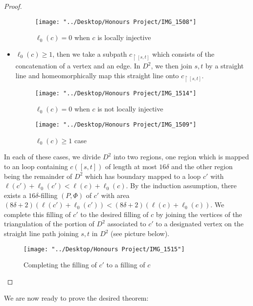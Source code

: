 \documentclass[12pt]{article}
\newcommand{\vs}{\vskip10pt}
\begin{document}
\begin{proof}
\begin{itemize}
\begin{figure} [H]
	\centering
	\texttt{[image: "../Desktop/Honours Project/IMG\_1508"]}
	\caption{$\ell_0(c) = 0$ when $c$ is locally injective}
	\label{fig:img1508}
\end{figure}
			\item $\ell_0(c) \geq 1$, then we take a subpath $c_{\restriction [s,t]}$ which consists of the concatenation of a vertex and an edge. In $D^2$, we then join $s,t$ by a straight line and homeomorphically map this straight line onto $c_{\restriction [s,t]}$. 
			
			\begin{figure} [H]
				\centering
				\texttt{[image: "../Desktop/Honours Project/IMG\_1514"]}
				\caption{$\ell_0(c) = 0$ when $c$ is not locally injective}
				\label{fig:img1514}
			\end{figure}
			
\begin{figure} [H]
	\centering
	\texttt{[image: "../Desktop/Honours Project/IMG\_1509"]}
	\caption{$\ell_0(c) \geq 1$ case}
	\label{fig:img1509}
\end{figure}
		\end{itemize}
	
		In each of these cases, we divide $D^2$ into two regions, one region which is mapped to an loop containing $c([s,t])$ of length at most $16 \delta$ and the other region being the remainder of $D^2$ which has boundary mapped to a loop $c'$ with $\ell(c') + \ell_0(c') < \ell(c) + \ell_0(c)$. By the induction assumption, there exists a $16 \delta$-filling $(P, \Phi)$ of $c'$ with area $(8 \delta + 2)(\ell(c') + \ell_0(c')) < (8 \delta + 2)(\ell(c) + \ell_0(c))$. We complete this filling of $c'$ to the desired filling of $c$ by joining the vertices of the triangulation of the portion of $D^2$ associated to $c'$ to a designated vertex on the straight line path joining $s,t$ in $D^2$ (see picture below). 

\begin{figure} [H]
	\centering
	\texttt{[image: "../Desktop/Honours Project/IMG\_1515"]}
	\caption{Completing the filling of $c'$ to a filling of $c$}
	\label{fig:img1515}
\end{figure}
		
	\end{proof}

	\vs
	
	We are now ready to prove the desired theorem:
	
\end{document}
